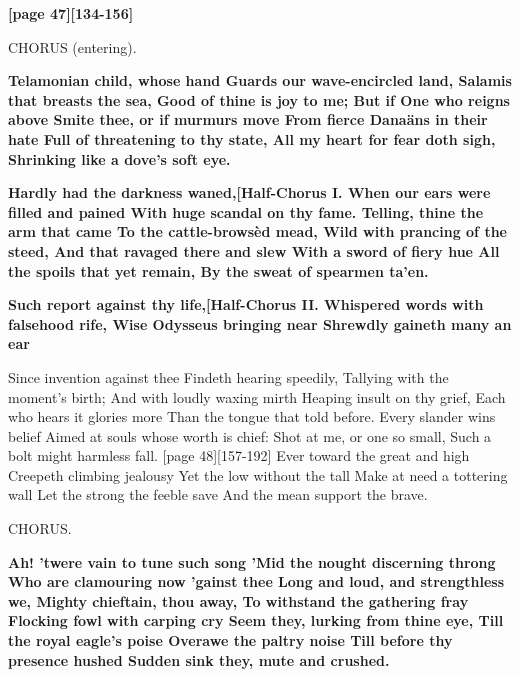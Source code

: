 \documentclass[11pt,letter]{book}
\begin{document}
\par \textbf{[page 47][134-156]}
\par 

\par  CHORUS (entering).

\par \textbf{Telamonian child, whose hand Guards our wave-encircled land, Salamis that breasts the sea, Good of thine is joy to me; But if One who reigns above Smite thee, or if murmurs move From fierce Danaäns in their hate Full of threatening to thy state, All my heart for fear doth sigh, Shrinking like a dove’s soft eye.}
\par 

\par \textbf{Hardly had the darkness waned,[Half-Chorus I. When our ears were filled and pained With huge scandal on thy fame. Telling, thine the arm that came To the cattle-browsèd mead, Wild with prancing of the steed, And that ravaged there and slew With a sword of fiery hue All the spoils that yet remain, By the sweat of spearmen ta’en.}
\par 

\par \textbf{Such report against thy life,[Half-Chorus II. Whispered words with falsehood rife, Wise Odysseus bringing near Shrewdly gaineth many an ear}
\par   Since invention against thee Findeth hearing speedily, Tallying with the moment’s birth; And with loudly waxing mirth Heaping insult on thy grief, Each who hears it glories more Than the tongue that told before. Every slander wins belief Aimed at souls whose worth is chief:  Shot at me, or one so small, Such a bolt might harmless fall. [page 48][157-192] Ever toward the great and high Creepeth climbing jealousy Yet the low without the tall Make at need a tottering wall Let the strong the feeble save And the mean support the brave.

\par  CHORUS.

\par \textbf{Ah! ’twere vain to tune such song ’Mid the nought discerning throng Who are clamouring now ’gainst thee Long and loud, and strengthless we, Mighty chieftain, thou away, To withstand the gathering fray Flocking fowl with carping cry Seem they, lurking from thine eye, Till the royal eagle’s poise Overawe the paltry noise Till before thy presence hushed Sudden sink they, mute and crushed.}
\par 
\end{document}
